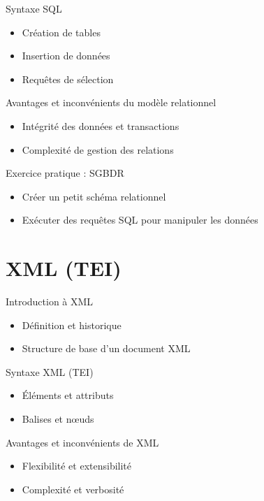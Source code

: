 \documentclass{beamer}
\begin{document}
\begin{frame}{Syntaxe SQL}
    \begin{itemize}
        \item Création de tables
        \item Insertion de données
        \item Requêtes de sélection
    \end{itemize}
\end{frame}

\begin{frame}{Avantages et inconvénients du modèle relationnel}
    \begin{itemize}
        \item Intégrité des données et transactions
        \item Complexité de gestion des relations
    \end{itemize}
\end{frame}

\begin{frame}{Exercice pratique : SGBDR}
    \begin{itemize}
        \item Créer un petit schéma relationnel
        \item Exécuter des requêtes SQL pour manipuler les données
    \end{itemize}
\end{frame}

\section{XML (TEI)}

\begin{frame}{Introduction à XML}
    \begin{itemize}
        \item Définition et historique
        \item Structure de base d'un document XML
    \end{itemize}
\end{frame}

\begin{frame}{Syntaxe XML (TEI)}
    \begin{itemize}
        \item Éléments et attributs
        \item Balises et nœuds
    \end{itemize}
\end{frame}

\begin{frame}{Avantages et inconvénients de XML}
    \begin{itemize}
        \item Flexibilité et extensibilité
        \item Complexité et verbosité
    \end{itemize}
\end{frame}
\end{document}
